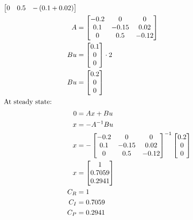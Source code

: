 \documentclass[12pt]{article}
\begin{document}
\begin{enumerate}
\begin{align*}
\begin{bmatrix}
        0 & 0.5 & -\left(0.1 + 0.02\right) \\
    \end{bmatrix} \\
    A &= \begin{bmatrix}
        -0.2 & 0 & 0 \\
        0.1 & -0.15 & 0.02 \\
        0 & 0.5 & -0.12 \\
    \end{bmatrix} \\
    Bu &= \begin{bmatrix}
        0.1 \\
        0 \\
        0 \\
    \end{bmatrix} \cdot 2 \\
    Bu &= \begin{bmatrix}
        0.2 \\
        0 \\
        0 \\
    \end{bmatrix} \\
    \intertext{At steady state:}
    0 &= Ax + Bu \\
    x &= -A^{-1} Bu \\
    x &= -\begin{bmatrix}
        -0.2 & 0 & 0 \\
        0.1 & -0.15 & 0.02 \\
        0 & 0.5 & -0.12 \\
    \end{bmatrix}^{-1} \begin{bmatrix}
        0.2 \\
        0 \\
        0 \\
    \end{bmatrix} \\
    x &= \begin{bmatrix}
        1 \\
        0.7059 \\
        0.2941 \\
    \end{bmatrix} \\
    C_R &= 1 \\
    C_I &= 0.7059 \\
    C_P &= 0.2941
\end{align*}

\end{enumerate}
\end{document}
